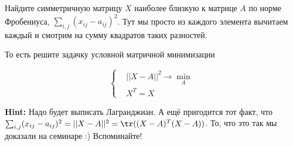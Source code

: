 \begin{problem}{}
	Найдите симметричную матрицу $X$ наиболее близкую к матрице $A$ по норме Фробениуса, $\sum_{i,j} (x_{ij} - a_{ij})^2$. Тут мы просто из каждого элемента вычитаем каждый и смотрим на сумму квадратов таких разностей. 
	
	То есть решите задачку условной матричной минимизации 
	
	\begin{equation*}
	\begin{cases}
	& ||X - A||^2 \to \min_{A}  \\
	& X^T = X
	\end{cases}
	\end{equation*}
	
	\textbf{Hint:} Надо будет выписать Лагранджиан.  А ещё пригодится тот факт, что $\sum_{i,j} (x_{ij} - a_{ij})^2 = ||X-A||^2 =  \tr((X-A)^T (X-A))$. То, что это так мы доказали на семинаре :) Вспоминайте! 
\end{problem}

